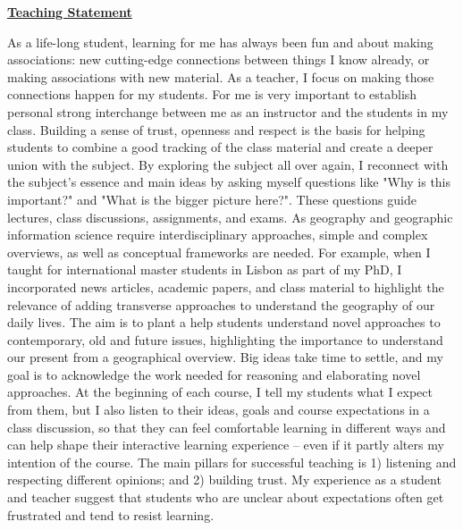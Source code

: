 \textbf{\underline{Teaching Statement}}

\begin{comment}

Beliefs:

1-3

1. Engagement, participation and bla bla
2. Content, 
3. Mentoring

\end{comment}
 
















As a life-long student, learning for me has always been fun and about making associations: new cutting-edge connections between things I know already, or making associations with new material. As a teacher, I focus on making those connections happen for my students. For me is very important to establish personal strong interchange between me as an instructor and the students in my class. Building a sense of trust, openness and respect is the basis for helping students to combine a good tracking of the class material and create a deeper union with the subject. By exploring the subject all over again, I reconnect with the subject’s essence and main ideas by asking myself questions like "Why is this important?" and "What is the bigger picture here?". These questions guide lectures, class discussions, assignments, and exams. As geography and geographic information science require interdisciplinary approaches, simple and complex overviews, as well as conceptual frameworks are needed. For example, when I taught for international master students in Lisbon as part of my PhD, I incorporated news articles, academic papers, and class material to highlight the relevance of adding transverse approaches to understand the geography of our daily lives. The aim is to plant a help students understand novel approaches to contemporary, old and future issues, highlighting the importance to understand our present from a geographical overview. Big ideas take time to settle, and my goal is to acknowledge the work needed for reasoning and elaborating novel approaches. At the beginning of each course, I tell my students what I expect from them, but I also listen to their ideas, goals and course expectations in a class discussion, so that they can feel comfortable learning in different ways and can help shape their interactive learning experience – even if it partly alters my intention of the course. The main pillars for successful teaching is 1) listening and respecting different opinions; and 2) building trust. My experience as a student and teacher suggest that students who are unclear about expectations often get frustrated and tend to resist learning.\par

